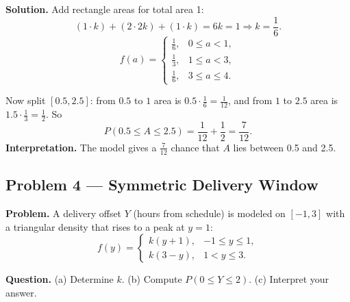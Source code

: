 \begin{ExamProblems}
		\textbf{Solution.}
		Add rectangle areas for total area 1:
		\[
		(1\cdot k)+(2\cdot 2k)+(1\cdot k)=6k=1\Rightarrow k=\frac{1}{6}.
		\]
		\[
		f(a)=\begin{cases}
		\frac{1}{6}, & 0\le a<1,\\
		\frac{1}{3}, & 1\le a<3,\\
		\frac{1}{6}, & 3\le a\le 4.
		\end{cases}
		\]
		\begin{center}
		\end{center}
		Now split $[0.5,2.5]$:
		from $0.5$ to $1$ area is $0.5\cdot\frac{1}{6}=\frac{1}{12}$,
		and from $1$ to $2.5$ area is $1.5\cdot\frac{1}{3}=\frac{1}{2}$.
		So
		\[
		P(0.5\le A\le 2.5)=\frac{1}{12}+\frac{1}{2}=\frac{7}{12}.
		\]
		\textbf{Interpretation.} The model gives a $\frac{7}{12}$ chance that $A$ lies between 0.5 and 2.5.
		
		
		\item
		\subsection*{Problem 4 — Symmetric Delivery Window}
		
		\textbf{Problem.}
		A delivery offset $Y$ (hours from schedule) is modeled on $[-1,3]$ with a triangular density
		that rises to a peak at $y=1$:
		\[
		f(y)=\begin{cases}
		k(y+1), & -1\le y\le 1,\\
		k(3-y), & 1< y\le 3.
		\end{cases}
		\]
		
		\textbf{Question.}
		(a) Determine $k$.
		(b) Compute $P(0\le Y\le 2)$.
		(c) Interpret your answer.
		

\end{ExamProblems}
